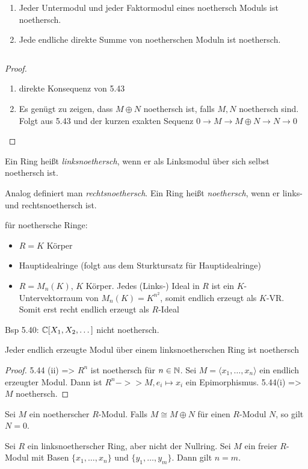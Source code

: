 \documentclass[../main.tex]{subfiles}
\begin{document}
\begin{corollary} $ $
    \begin{enumerate}[label=(\roman*)]
        \item Jeder Untermodul und jeder Faktormodul eines noethersch Moduls ist noethersch.
        \item Jede endliche direkte Summe von noetherschen Moduln ist noethersch.
    \end{enumerate}
\end{corollary} $ $
\begin{proof}$ $
    \begin{enumerate}[label=(\roman*)]
        \item direkte Konsequenz von 5.43
        \item Es genügt zu zeigen, dass $M\oplus N$ noethersch ist, falls $M,N$ noethersch sind. Folgt aus 5.43 und der kurzen exakten Sequenz $0\rightarrow M \rightarrow M\oplus N \rightarrow N \rightarrow 0$
    \end{enumerate}
\end{proof}

\begin{definition}
    Ein Ring heißt \emph{linksnoethersch}, wenn er als Linksmodul über sich selbst noethersch ist.

    Analog definiert man \emph{rechtsnoethersch}.
    Ein Ring heißt \emph{noethersch}, wenn er links- und rechtsnoethersch ist.
\end{definition}
\begin{example*}
    für noethersche Ringe:
    \begin{itemize}
        \item $R=K$ Körper
        \item Hauptidealringe (folgt aus dem Sturktursatz für Hauptidealringe)
        \item $R=M_n(K)$, $K$ Körper. Jedes (Links-) Ideal in $R$ ist ein $K$-Untervektorraum von $M_n(K) = K^{n^2}$, somit endlich erzeugt als $K$-VR. Somit erst recht endlich erzeugt als $R$-Ideal
    \end{itemize}
    Bsp 5.40: $\mathbb{C}[X_1,X_2,\dots]$ nicht noethersch.
\end{example*}
\begin{lemma}
    Jeder endlich erzeugte Modul über einem linksnoetherschen Ring ist noethersch
\end{lemma}
\begin{proof}
    5.44 (ii) => $R^n$ ist noethersch für $n\in \mathbb{N}$.
    Sei $M=\langle x_1, \dots, x_n\rangle$ ein endlich erzeugter Modul. Dann ist $R^n ->> M, e_i\mapsto x_i$ ein Epimorphismus.
    5.44(i) => $M$ noethersch.
\end{proof}
\begin{lemma}
    Sei $M$ ein noetherscher $R$-Modul. Falls $M\cong M\oplus N$ für einen $R$-Modul $N$, so gilt $N=0$.
\end{lemma}
\begin{theorem}
    Sei $R$ ein linksnoetherscher Ring, aber nicht der Nullring.
    Sei $M$ ein freier $R$-Modul mit Basen $\{x_1,\dots,x_n\}$ und $\{y_1,\dots,y_m\}$. Dann gilt $n=m$.
\end{theorem}
\end{document}

